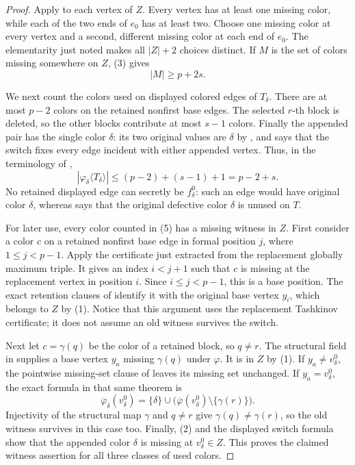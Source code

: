 \begin{proof}
Apply  to each vertex of
$Z$.  Every vertex has at least one missing color, while each of the two
ends of $e_0$ has at least two.  Choose one missing color at every vertex
and a second, different missing color at each end of $e_0$.  The
elementarity just noted makes all $|Z|+2$ choices distinct.  If $M$ is
the set of colors missing somewhere on $Z$, (3) gives
\[
                         |M|\geq p+2s.                             \tag{4}
\]

We next count the colors used on displayed colored edges of $T_\delta$.
There are at most $p-2$ colors on the retained nonfirst base edges.  The
selected $r$-th block is deleted, so the other blocks contribute at most
$s-1$ colors.  Finally the appended pair has the single color $\delta$:
its two original values are $\delta$ by
, and
 says that the switch fixes every
edge incident with either appended vertex.  Thus, in the terminology of
,
\[
       |\varphi_\delta\langle T_\delta\rangle|
          \leq (p-2)+(s-1)+1=p-2+s.                               \tag{5}
\]
No retained displayed edge can secretly be $f^0_\delta$: such an edge
would have original color $\delta$, whereas
 says that the original defective
color $\delta$ is unused on $T$.

For later use, every color counted in (5) has a missing witness in $Z$.
First consider a color $c$ on a retained nonfirst base edge in formal
position $j$, where $1\leq j<p-1$.  Apply the
 certificate just extracted from the replacement
globally maximum triple.  It gives an index $i<j+1$ such that $c$ is
missing at the replacement vertex in position $i$.  Since $i\leq j<p-1$,
this is a base position.  The exact retention clauses of
 identify it with the original base
vertex $y_i$, which belongs to $Z$ by (1).  Notice that this argument
uses the replacement Tashkinov certificate; it does not assume an old
witness survives the switch.

Next let $c=\gamma(q)$ be the color of a retained block, so $q\ne r$.
The structural field in 
supplies a base vertex $y_a$ missing $\gamma(q)$ under $\varphi$.  It is
in $Z$ by (1).  If $y_a\ne v^0_\delta$, the pointwise missing-set clause
of  leaves its missing set
unchanged.  If $y_a=v^0_\delta$, the exact formula in that same theorem is
\[
 \overline\varphi_\delta(v^0_\delta)
   =\{\delta\}\cup
     \bigl(\overline\varphi(v^0_\delta)\setminus\{\gamma(r)\}\bigr).
\]
Injectivity of the structural map $\gamma$ and $q\ne r$ give
$\gamma(q)\ne\gamma(r)$, so the old witness survives in this case too.
Finally, (2) and the displayed switch formula show that the appended
color $\delta$ is missing at $v^0_\delta\in Z$.  This proves the claimed
witness assertion for all three classes of used colors.


\end{proof}
